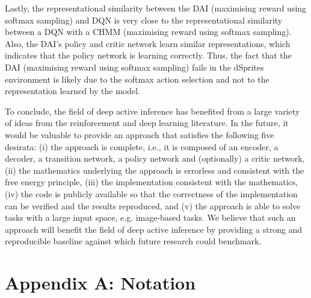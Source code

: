\documentclass[twoside,11pt]{article}
\begin{document}
Lastly, the representational similarity between the DAI (maximising reward using softmax sampling) and DQN is very close to the representational similarity between a DQN with a CHMM (maximising reward using softmax sampling). Also, the DAI's policy and critic network learn similar representations, which indicates that the policy network is learning correctly. Thus, the fact that the DAI (maximising reward using softmax sampling) fails in the dSprites environment is likely due to the softmax action selection and not to the representation learned by the model.

To conclude, the field of deep active inference has benefited from a large variety of ideas from the reinforcement and deep learning literature. In the future, it would be valuable to provide an approach that satisfies the following five desirata: (i) the approach is complete, i.e., it is composed of an encoder, a decoder, a transition network, a policy network and (optionally) a critic network, (ii) the mathematics underlying the approach is errorless and consistent with the free energy principle, (iii) the implementation consistent with the mathematics, (iv) the code is publicly available so that the correctness of the implementation can be verified and the results reproduced, and (v) the approach is able to solve tasks with a large input space, e.g. image-based tasks. We believe that such an approach will benefit the field of deep active inference by providing a strong and reproducible baseline against which future research could benchmark.


\vskip 0.2in


\appendix

\section*{Appendix A: Notation}

\end{document}
